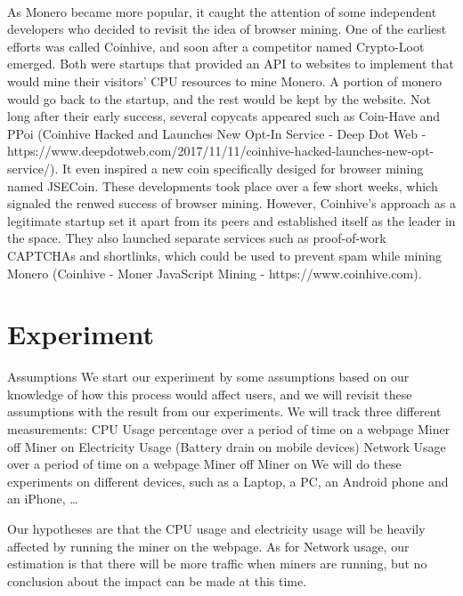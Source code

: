 \\
As Monero became more popular, it caught the attention of some independent developers who decided to revisit the idea of browser mining. One of the earliest efforts was called Coinhive, and soon after a competitor named Crypto-Loot emerged. Both were startups that provided an API to websites to implement that would mine their visitors' CPU resources to mine Monero. A portion of monero would go back to the startup, and the rest would be kept by the website. Not long after their early success, several copycats appeared such as Coin-Have and PPoi (Coinhive Hacked and Launches New Opt-In Service - Deep Dot Web - https://www.deepdotweb.com/2017/11/11/coinhive-hacked-launches-new-opt-service/). It even inspired a new coin specifically desiged for browser mining named JSECoin. These developments took place over a few short weeks, which signaled the renwed success of browser mining. However, Coinhive's approach as a legitimate startup set it apart from its peers and established itself as the leader in the space. They also launched separate services such as proof-of-work CAPTCHAs and shortlinks, which could be used to prevent spam while mining Monero (Coinhive - Moner JavaScript Mining - https://www.coinhive.com).


\section{Experiment}

Assumptions
	We start our experiment by some assumptions based on our knowledge of how this process would affect users, and we will revisit these assumptions with the result from our experiments.
We will track three different measurements:
CPU Usage percentage over a period of time on a webpage
Miner off
Miner on
Electricity Usage (Battery drain on mobile devices)
Network Usage over a period of time on a webpage
Miner off
Miner on
We will do these experiments on different devices, such as a Laptop, a PC, an Android phone and an iPhone, …

\begin{center}
\end{center}


Our hypotheses are that the CPU usage and electricity usage will be heavily affected by running the miner on the webpage. As for Network usage, our estimation is that there will be more traffic when miners are running, but no conclusion about the impact can be made at this time.



